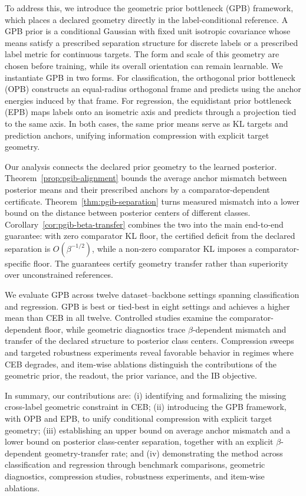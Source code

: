 \documentclass{article} %
\theoremstyle{plain}
\theoremstyle{remark}
\begin{document}
To address this, we introduce the geometric prior bottleneck (GPB) framework, which
places a declared geometry directly in the label-conditional reference. A GPB prior
is a conditional Gaussian
with fixed unit isotropic covariance whose means satisfy a prescribed separation
structure for discrete labels or a prescribed label metric for continuous targets.
The form and scale of this geometry are chosen before training, while its overall
orientation can remain learnable. We instantiate GPB in two forms. For classification, the
orthogonal prior bottleneck (OPB) constructs an equal-radius orthogonal frame and
predicts using the anchor energies induced by that frame. For regression, the
equidistant prior bottleneck (EPB) maps labels onto an isometric axis and predicts
through a projection tied to the same axis. In both cases, the same prior means
serve as KL targets and prediction anchors, unifying information compression with
explicit target geometry.

Our analysis connects the declared prior geometry to the learned posterior.
Theorem~\ref{prop:pgib-alignment} bounds the average anchor mismatch between
posterior means and their prescribed anchors by a comparator-dependent
certificate. Theorem~\ref{thm:pgib-separation} turns measured mismatch into a
lower bound on the distance between posterior centers of different classes.
Corollary~\ref{cor:pgib-beta-transfer} combines the two into the main end-to-end
guarantee: with zero comparator KL floor, the certified deficit from the declared
separation is $O(\beta^{-1/2})$, while a non-zero comparator KL imposes a
comparator-specific floor. The guarantees certify geometry transfer rather than
superiority over unconstrained references.

We evaluate GPB across twelve dataset--backbone settings spanning classification
and regression. GPB is best or tied-best in eight settings and achieves a higher
mean than CEB in all twelve. Controlled studies examine the comparator-dependent
floor, while geometric diagnostics trace $\beta$-dependent mismatch and transfer of
the declared structure to posterior class centers. Compression sweeps and
targeted robustness experiments reveal favorable behavior in regimes where CEB
degrades, and item-wise ablations distinguish the contributions of the geometric
prior, the readout, the prior variance, and the IB objective.

In summary, our contributions are: (i) identifying and formalizing the missing
cross-label geometric constraint in CEB; (ii) introducing the GPB framework, with OPB and EPB, to
unify conditional compression with explicit target geometry; (iii) establishing an
upper bound on average anchor mismatch and a lower bound on posterior class-center
separation, together with an explicit $\beta$-dependent geometry-transfer rate; and
(iv) demonstrating the method across classification and regression through
benchmark comparisons, geometric diagnostics, compression studies, robustness
experiments, and item-wise ablations.
\end{document}
